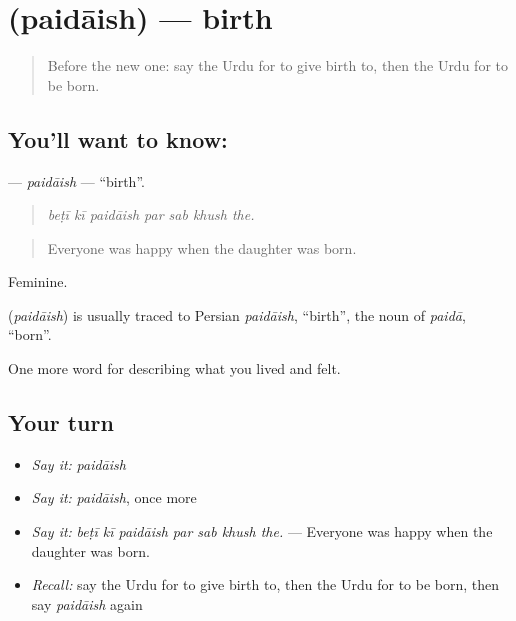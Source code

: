 \section[\texorpdfstring{\ur{پیدائش} (paidāish)}{پیدائش (paidāish)}]{ (paidāish) — birth}

\label{lesson:UR-C483-paidaish}



\begin{quote}
Before the new one: say the Urdu for to give birth to, then the Urdu for to be born.
\end{quote}

\subsection*{You'll want to know: }
\textbf{} — \emph{paidāish} — \textquotedblleft{}birth\textquotedblright{}.

\begin{quote}
      
\end{quote}

\begin{quote}
\emph{beṭī kī paidāish par sab khush the.}
\end{quote}

\begin{quote}
Everyone was happy when the daughter was born.
\end{quote}

Feminine.

\begin{cousinweb}
\textbf{} (\emph{paidāish}) is usually traced to Persian \emph{paidāish}, \textquotedblleft{}birth\textquotedblright{}, the noun of \emph{paidā}, \textquotedblleft{}born\textquotedblright{}.
\end{cousinweb}

\begin{grammarlens}[title={What you've built}]
One more word for describing what you lived and felt.
\end{grammarlens}

\subsection*{Your turn}
\begin{itemize}
\raggedright
  \item \emph{Say it:} \emph{paidāish}
  \item \emph{Say it:} \emph{paidāish}, once more
  \item \emph{Say it:} \emph{beṭī kī paidāish par sab khush the.} — Everyone was happy when the daughter was born.
  \item \emph{Recall:} say the Urdu for to give birth to, then the Urdu for to be born, then say \emph{paidāish} again
\end{itemize}

